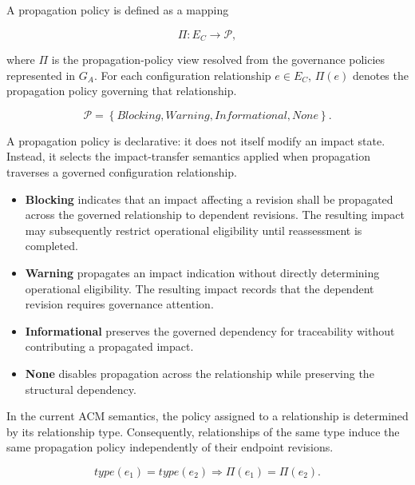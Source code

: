 \documentclass[10pt]{article}
\begin{document}
A propagation policy is defined as a mapping

\begin{equation}
	\Pi:E_C\rightarrow\mathcal P,
	\label{eq:policy_mapping}
\end{equation}

where $\Pi$ is the propagation-policy view resolved from the governance policies represented in $G_A$. For each configuration relationship $e\in E_C$, $\Pi(e)$ denotes the propagation policy governing that relationship.

\begin{equation}
	\mathcal{P}=
	\left\{
	\textit{Blocking},
	\textit{Warning},
	\textit{Informational},
	\textit{None}
	\right\}.
	\label{eq:policy_space}
\end{equation}

A propagation policy is declarative: it does not itself modify an impact state. Instead, it selects the impact-transfer semantics applied when propagation traverses a governed configuration relationship.

\begin{itemize}
	\item \textbf{Blocking} indicates that an impact affecting a revision shall be
	propagated across the governed relationship to dependent revisions. The resulting impact may subsequently restrict operational eligibility until reassessment is completed.
	
	\item \textbf{Warning} propagates an impact indication without directly
	determining operational eligibility. The resulting impact records that the
	dependent revision requires governance attention.
	
	\item \textbf{Informational} preserves the governed dependency for traceability
	without contributing a propagated impact.
	
	\item \textbf{None} disables propagation across the relationship while preserving the structural dependency.
\end{itemize}


In the current ACM semantics, the policy assigned to a relationship is determined by its relationship type. Consequently, relationships of the same type induce the same propagation policy independently of their endpoint revisions.

\begin{equation}
	type(e_1)=type(e_2)
	\Longrightarrow
	\Pi(e_1)=\Pi(e_2).
	\label{eq:policy_type_consistency}
\end{equation}
\end{document}
